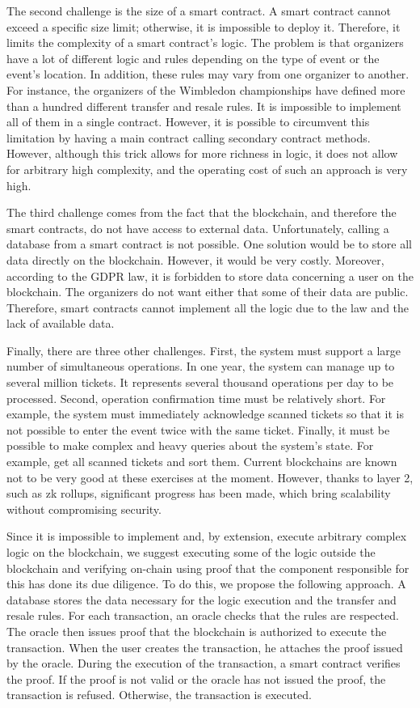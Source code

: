 \documentclass[a4paper,11pt,oneside]{report}
\begin{document}
The second challenge is the size of a smart contract. A smart contract cannot exceed a specific size limit; otherwise, it is impossible to deploy it. Therefore, it limits the complexity of a smart contract's logic. The problem is that organizers have a lot of different logic and rules depending on the type of event or the event's location. In addition, these rules may vary from one organizer to another. For instance, the organizers of the Wimbledon championships have defined more than a hundred different transfer and resale rules. It is impossible to implement all of them in a single contract. However, it is possible to circumvent this limitation by having a main contract calling secondary contract methods. However, although this trick allows for more richness in logic, it does not allow for arbitrary high complexity, and the operating cost of such an approach is very high.

The third challenge comes from the fact that the blockchain, and therefore the smart contracts, do not have access to external data. Unfortunately, calling a database from a smart contract is not possible. One solution would be to store all data directly on the blockchain. However, it would be very costly. Moreover, according to the GDPR law, it is forbidden to store data concerning a user on the blockchain. The organizers do not want either that some of their data are public. Therefore, smart contracts cannot implement all the logic due to the law and the lack of available data.

Finally, there are three other challenges. First, the system must support a large number of simultaneous operations. In one year, the system can manage up to several million tickets. It represents several thousand operations per day to be processed. Second, operation confirmation time must be relatively short. For example, the system must immediately acknowledge scanned tickets so that it is not possible to enter the event twice with the same ticket. Finally, it must be possible to make complex and heavy queries about the system's state. For example, get all scanned tickets and sort them. Current blockchains are known not to be very good at these exercises at the moment. However, thanks to layer 2, such as zk rollups, significant progress has been made, which bring scalability without compromising security.

Since it is impossible to implement and, by extension, execute arbitrary complex logic on the blockchain, we suggest executing some of the logic outside the blockchain and verifying on-chain using proof that the component responsible for this has done its due diligence. To do this, we propose the following approach. A database stores the data necessary for the logic execution and the transfer and resale rules. For each transaction, an oracle checks that the rules are respected. The oracle then issues proof that the blockchain is authorized to execute the transaction. When the user creates the transaction, he attaches the proof issued by the oracle. During the execution of the transaction, a smart contract verifies the proof. If the proof is not valid or the oracle has not issued the proof, the transaction is refused. Otherwise, the transaction is executed.
\end{document}
